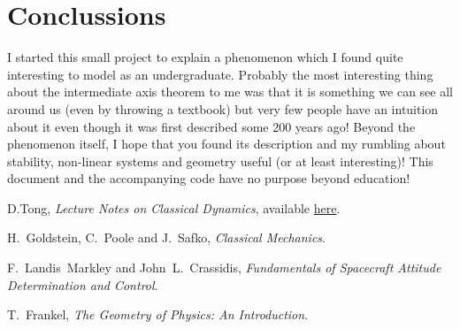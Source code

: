 \documentclass[a4paper]{article}
\begin{document}
	\section{Conclussions}
	I started this small project to explain a phenomenon which I found quite interesting to model as an undergraduate.
	Probably the most interesting thing about the intermediate axis theorem to me was that it is something we can see all around us (even by throwing a textbook) but very few people have an intuition about it even though it was first described some 200 years ago!
	Beyond the phenomenon itself, I hope that you found its description and my rumbling about stability, non-linear systems and geometry useful (or at least interesting)!
	This document and the accompanying code have no purpose beyond education!
	
	\newpage
	\begin{thebibliography}{9}

	D.Tong, \textit{Lecture Notes on Classical Dynamics}, available \href{http://www.damtp.cam.ac.uk/user/tong/dynamics/clas.pdf}{here}.

	H.~Goldstein, C.~Poole and J.~Safko, \textit{Classical Mechanics}.
	
	F.~Landis~Markley and John~L.~Crassidis, \textit{Fundamentals of Spacecraft Attitude Determination and Control}.

	T.~Frankel, \textit{The Geometry of Physics: An Introduction}.


	\end{thebibliography}
\end{document}
